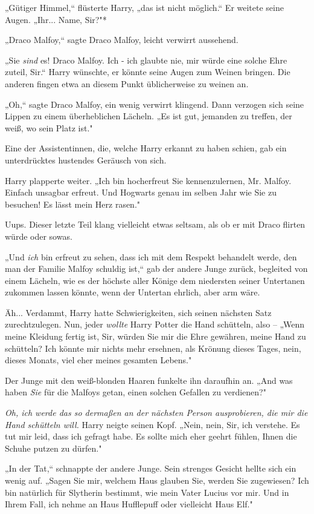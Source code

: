{„Gütiger Himmel,“ flüsterte Harry, „das ist nicht möglich.“ Er weitete seine Augen. „Ihr... Name, Sir?"*

„Draco Malfoy,“ sagte Draco Malfoy, leicht verwirrt aussehend.

„Sie \emph{sind} es! Draco Malfoy. Ich - ich glaubte nie, mir würde eine solche Ehre zuteil, Sir.“ Harry wünschte, er könnte seine Augen zum Weinen bringen. Die anderen fingen etwa an diesem Punkt üblicherweise zu weinen an.

„Oh,“ sagte Draco Malfoy, ein wenig verwirrt klingend. Dann verzogen sich seine Lippen zu einem überheblichen Lächeln. „Es ist gut, jemanden zu treffen, der weiß, wo sein Platz ist."

Eine der Assistentinnen, die, welche Harry erkannt zu haben schien, gab ein unterdrücktes hustendes Geräusch von sich.

Harry plapperte weiter. „Ich bin hocherfreut Sie kennenzulernen, Mr. Malfoy. Einfach unsagbar erfreut. Und Hogwarts genau im selben Jahr wie Sie zu besuchen! Es lässt mein Herz rasen."

Uups. Dieser letzte Teil klang vielleicht etwas seltsam, als ob er mit Draco flirten würde oder sowas.

„Und \emph{ich} bin erfreut zu sehen, dass ich mit dem Respekt behandelt werde, den man der Familie Malfoy schuldig ist,“ gab der andere Junge zurück, begleited von einem Lächeln, wie es der höchste aller Könige dem niedersten seiner Untertanen zukommen lassen könnte, wenn der Untertan ehrlich, aber arm wäre.

Äh... Verdammt, Harry hatte Schwierigkeiten, sich seinen nächsten Satz zurechtzulegen. Nun, jeder \emph{wollte} Harry Potter die Hand schütteln, also -- „Wenn meine Kleidung fertig ist, Sir, würden Sie mir die Ehre gewähren, meine Hand zu schütteln? Ich könnte mir nichts mehr ersehnen, als Krönung dieses Tages, nein, dieses Monats, viel eher meines gesamten Lebens."

Der Junge mit den weiß-blonden Haaren funkelte ihn daraufhin an. „And was haben \emph{Sie} für die Malfoys getan, einen solchen Gefallen zu verdienen?"

\emph{Oh, ich werde das so dermaßen an der nächsten Person ausprobieren, die mir die Hand schütteln will.} Harry neigte seinen Kopf. „Nein, nein, Sir, ich verstehe. Es tut mir leid, dass ich gefragt habe. Es sollte mich eher geehrt fühlen, Ihnen die Schuhe putzen zu dürfen."

„In der Tat,“ schnappte der andere Junge. Sein strenges Gesicht hellte sich ein wenig auf. „Sagen Sie mir, welchem Haus glauben Sie, werden Sie zugewiesen? Ich bin natürlich für Slytherin bestimmt, wie mein Vater Lucius vor mir. Und in Ihrem Fall, ich nehme an Haus Hufflepuff oder vielleicht Haus Elf."

}
